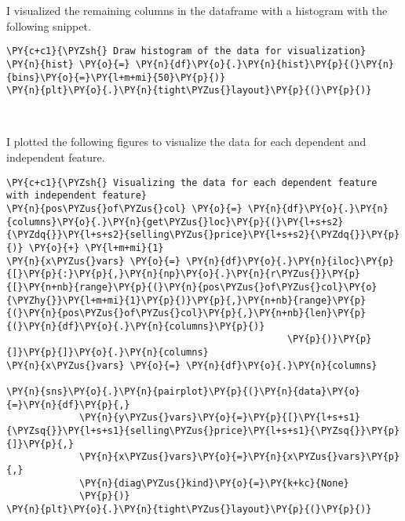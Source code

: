 \newpage

I visualized the remaining columns in the dataframe with a histogram with the
following snippet. 

\begin{tcolorbox}[breakable, size=fbox, boxrule=1pt, pad at break*=1mm,colback=cellbackground, colframe=cellborder]
\begin{Verbatim}[commandchars=\\\{\}]
\PY{c+c1}{\PYZsh{} Draw histogram of the data for visualization}
\PY{n}{hist} \PY{o}{=} \PY{n}{df}\PY{o}{.}\PY{n}{hist}\PY{p}{(}\PY{n}{bins}\PY{o}{=}\PY{l+m+mi}{50}\PY{p}{)}
\PY{n}{plt}\PY{o}{.}\PY{n}{tight\PYZus{}layout}\PY{p}{(}\PY{p}{)}
\end{Verbatim}
\end{tcolorbox}
    \begin{center}
    \end{center}
    { \hspace*{\fill} \\}
        
I plotted the following figures to visualize the data for each dependent and independent feature.

\begin{tcolorbox}[breakable, size=fbox, boxrule=1pt, pad at break*=1mm,colback=cellbackground, colframe=cellborder]
\begin{Verbatim}[commandchars=\\\{\}]
\PY{c+c1}{\PYZsh{} Visualizing the data for each dependent feature with independent feature}
\PY{n}{pos\PYZus{}of\PYZus{}col} \PY{o}{=} \PY{n}{df}\PY{o}{.}\PY{n}{columns}\PY{o}{.}\PY{n}{get\PYZus{}loc}\PY{p}{(}\PY{l+s+s2}{\PYZdq{}}\PY{l+s+s2}{selling\PYZus{}price}\PY{l+s+s2}{\PYZdq{}}\PY{p}{)} \PY{o}{+} \PY{l+m+mi}{1}
\PY{n}{x\PYZus{}vars} \PY{o}{=} \PY{n}{df}\PY{o}{.}\PY{n}{iloc}\PY{p}{[}\PY{p}{:}\PY{p}{,}\PY{n}{np}\PY{o}{.}\PY{n}{r\PYZus{}}\PY{p}{[}\PY{n+nb}{range}\PY{p}{(}\PY{n}{pos\PYZus{}of\PYZus{}col}\PY{o}{\PYZhy{}}\PY{l+m+mi}{1}\PY{p}{)}\PY{p}{,}\PY{n+nb}{range}\PY{p}{(}\PY{n}{pos\PYZus{}of\PYZus{}col}\PY{p}{,}\PY{n+nb}{len}\PY{p}{(}\PY{n}{df}\PY{o}{.}\PY{n}{columns}\PY{p}{)}
                                                  \PY{p}{)}\PY{p}{]}\PY{p}{]}\PY{o}{.}\PY{n}{columns}
\PY{n}{x\PYZus{}vars} \PY{o}{=} \PY{n}{df}\PY{o}{.}\PY{n}{columns}

\PY{n}{sns}\PY{o}{.}\PY{n}{pairplot}\PY{p}{(}\PY{n}{data}\PY{o}{=}\PY{n}{df}\PY{p}{,}
             \PY{n}{y\PYZus{}vars}\PY{o}{=}\PY{p}{[}\PY{l+s+s1}{\PYZsq{}}\PY{l+s+s1}{selling\PYZus{}price}\PY{l+s+s1}{\PYZsq{}}\PY{p}{]}\PY{p}{,}
             \PY{n}{x\PYZus{}vars}\PY{o}{=}\PY{n}{x\PYZus{}vars}\PY{p}{,}
             \PY{n}{diag\PYZus{}kind}\PY{o}{=}\PY{k+kc}{None}
             \PY{p}{)}
\PY{n}{plt}\PY{o}{.}\PY{n}{tight\PYZus{}layout}\PY{p}{(}\PY{p}{)}
\end{Verbatim}
\end{tcolorbox}

